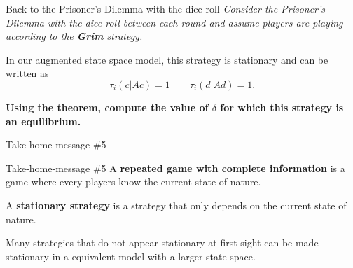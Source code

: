 \begin{frame}{Back to the Prisoner's Dilemma with the dice roll}
    \textit{Consider the Prisoner's Dilemma with the dice roll between each round
    and assume players are playing according to the \textbf{Grim} strategy.}
   
    \vspace{0.5cm}
    In our augmented state space model, this strategy is stationary and can be written as
    $$\tau_i(c|Ac) = 1 \qquad \tau_i(d|Ad) = 1.$$
    
    \vspace{1cm}
    \textbf{\color{green}Using the theorem, compute the value of $\delta$ for which this strategy
    is an equilibrium.}
\end{frame}


\begin{frame}{Take home message \#5}
    \begin{block}{Take-home-message \#5}
        A \textbf{repeated game with complete information} is a game where {\color{green}
        every players know the current state of nature}.
        
        A \textbf{stationary strategy} is a strategy that {\color{green}only depends on the current
        state of nature}.
        
        Many strategies that do not appear stationary at first sight can be made stationary in a equivalent
        model with a larger state space.
    \end{block}
\end{frame}
